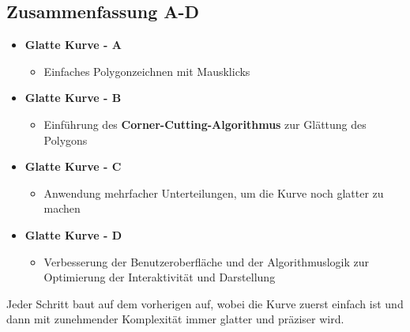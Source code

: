 \subsection*{Zusammenfassung A-D}
\begin{itemize}[itemsep=0pt]
   \item \textbf{Glatte Kurve - A}
   \begin{itemize}
    \item Einfaches Polygonzeichnen mit Mausklicks
   \end{itemize}
   \item \textbf{Glatte Kurve - B}
   \begin{itemize}
    \item Einführung des \textbf{Corner-Cutting-Algorithmus} zur Glättung des Polygons
   \end{itemize}
   \item \textbf{Glatte Kurve - C}
   \begin{itemize}
    \item Anwendung mehrfacher Unterteilungen, um die Kurve noch glatter zu machen
   \end{itemize}
   \item \textbf{Glatte Kurve - D}
   \begin{itemize}
    \item Verbesserung der Benutzeroberfläche und der Algorithmuslogik zur Optimierung der Interaktivität und Darstellung
   \end{itemize}
\end{itemize}
Jeder Schritt baut auf dem vorherigen auf, wobei die Kurve zuerst einfach ist und dann mit zunehmender Komplexität immer glatter und präziser wird.
